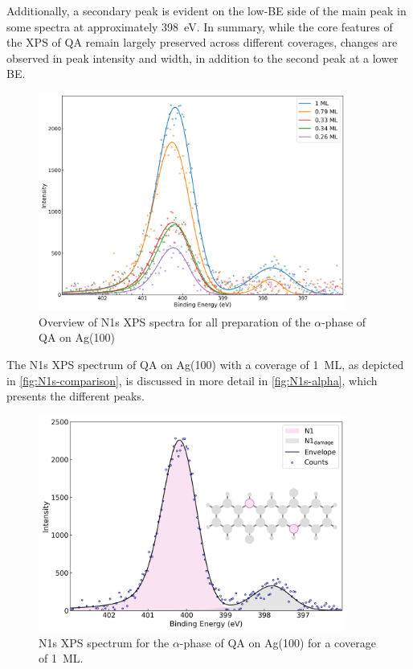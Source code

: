 Additionally, a secondary peak is evident on the low-\ac{BE} side of the main peak in some spectra at approximately 398~\si{\eV}. In summary, while the core features of the \ac{XPS} of \ac{QA} remain largely preserved across different coverages, changes are observed in peak intensity and width, in addition to the second peak at a lower \ac{BE}.

\begin{figure}[H]
	\centering
	\includegraphics[width=0.9\textwidth]{images/N1s-alpha-comparison.png}
	\caption{Overview of N1s \ac{XPS} spectra for all preparation of the $\alpha$-phase of \ac{QA} on Ag(100)}
	\label{fig:N1s-comparison}
\end{figure}

The N1s \ac{XPS} spectrum of \ac{QA} on Ag(100) with a coverage of 1~\ac{ML}, as depicted in \autoref{fig:N1s-comparison}, is discussed in more detail in \autoref{fig:N1s-alpha}, which presents the different peaks.

\begin{figure}[H]
	\centering
	\includegraphics[width=0.9\textwidth]{images/N1s-alpha-P1.png}
	\caption{N1s \ac{XPS} spectrum for the $\alpha$-phase of \ac{QA} on Ag(100) for a coverage of 1~\ac{ML}.}
	\label{fig:N1s-alpha}
\end{figure}


